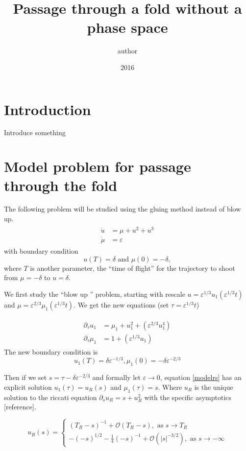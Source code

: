 \documentclass[letterpaper,11pt]{article}
\title{Passage through a fold without a phase space}
\author{author}
\date{2016}
\newcommand{\rmO}{\mathcal{O}}
\newcommand{\eps}{\varepsilon}
\numberwithin{equation}{section}
\theoremstyle{plain}
\begin{document}
\section{Introduction}

Introduce something


\section{Model problem for passage through the fold}
The following problem will be studied using the gluing method instead of blow up.
\begin{align}
\label{model}
\begin{split}
\dot{u} &= \mu+u^2 +u^3\\
\dot{\mu} &= \eps
\end{split}
\end{align}
with boundary condition 
\begin{equation}\label{oBC}
u(T) = \delta \text{ and }\mu(0) =-\delta,
\end{equation}
 where $T$ is another parameter, the ``time of flight'' for the trajectory to shoot from $\mu = -\delta$ to $u = \delta$.

We first study the ``blow up '' problem, starting with rescale $ u = \eps^{1/3}u_1(\eps^{1/3}t)$ and $\mu = \eps^{2/3}\mu_1(\eps^{1/3}t)$. We get the new equations (set $\tau=\eps^{1/3}t$)

\begin{align}
\label{modelrs}
\begin{split}
\partial_\tau u_1 &= \mu_1+u_1^2 +(\eps^{2/3}u_1^4)\\
\partial_\tau \mu_1 &= 1 +(\eps^{1/3} u_1)
\end{split}
\end{align}
The new boundary condition is
\begin{equation}\label{BCs}
u_1(T) = \delta \eps^{-1/3}, \mu_1(0) = -\delta \eps^{-2/3}
\end{equation}

Then if we set $s = \tau - \delta\eps^{-2/3}$ and formally let $\eps \to 0$, equation \eqref{modelrs} has an explicit solution $u_1(\tau) = u_R(s)$ and $\mu_1(\tau) = s$. Where $u_R$ is the unique solution to the riccati equation $\partial_s u_R = s+u_R^2$ with the specific asymptotics [reference]. 

\begin{equation}
\label{ricasy}
u_R(s)=\begin{cases}
  (T_R-s)^{-1}+\rmO(T_R-s), \text{ as }s \to T_R \\
 -(-s)^{1/2} -\frac{1}{4}(-s)^{-1} + \rmO(|s|^{-3/2}), \text{ as }s \to -\infty
\end{cases}
\end{equation}
\end{document}
